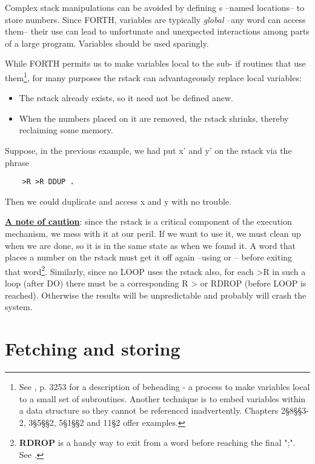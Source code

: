 Complex stack manipulations can be avoided by defining s --named locations-- to store numbers. Since FORTH, variables are typically \textit{global} --any word can access them-- their use can lead to unfortunate and unexpected interactions among parts of a large program. Variables should be used sparingly.

While FORTH permits us to make variables local to the sub- if routines that use them\footnote{See \FTR, p. 3253 for a description of beheading - a process to make variables local to a small set of subroutines. Another technique is to embed variables within a data structure so they cannot be referenccd inadvertently. Chapters 2§8§§3-2, 3§5§§2, 5§1§§2 and 11§2 offer examples.}, for many purposes the rstack can advantageously replace local variables:

\begin{itemize}
    \item The rstack already exists, so it need not be defined anew.
    \item When the numbers placed on it are removed, the rstack shrinks, thereby reclaiming some memory.
\end{itemize}

Suppose, in the previous example, we had put x’ and y’ on the rstack via the phrase

\begin{lstlisting}
    >R >R DDUP .
\end{lstlisting}

Then we could duplicate and access x and y with no trouble.

\leftbar[1\linewidth]
\underline{\textbf{A note of caution}}: since the rstack is a critical component of the execution mechanism, we mess with it at our peril. If we want to use it, we must clean up when we are done, so it is in the same state as when we found it. A word that places a number on the rstack must get it off again --using  or -- before exiting that word\footnote{\textbf{RDROP} is a handy way to exit from a word before reaching the final ";". See \TF.}. Similarly, since no LOOP uses the rstack also, for each >R in such a loop (after DO) there must be a corresponding R > or RDROP (before LOOP is reached). Otherwise the results will be unpredictable and probably will crash the system.
\endleftbar

\section{Fetching and storing}

